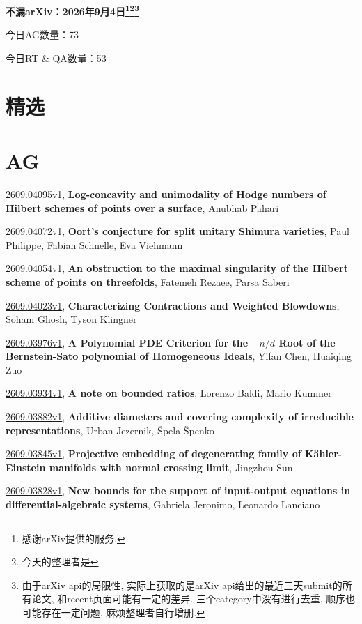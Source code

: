 \documentclass[9pt, a4paper]{article}
\theoremstyle{plain}
\theoremstyle{definition}
\theoremstyle{remark}
\newcommand{\arxiv}[3]{\href{https://arxiv.org/abs/#1}{#1}, \textbf{\textcolor{arxivblue}{#2}}, #3}
\newcommand{\AGnumber}{73}
\newcommand{\RTQAnumber}{53}
\newcommand{\NewestDate}{2026年9月4日}
\newcommand{\todayarXiver}{} %
\begin{document}
\begin{center}
    \Huge\textbf{不漏arXiv：\NewestDate\footnote{感谢arXiv提供的服务.}\footnote{今天的整理者是\todayarXiver}\footnote{由于arXiv api的局限性, 实际上获取的是arXiv api给出的最近三天submit的所有论文, 和recent页面可能有一定的差异. 三个category中没有进行去重, 顺序也可能存在一定问题, 麻烦整理者自行增删.}} \\
\end{center}

\setcounter{section}{-1}

\begin{center}
    今日AG数量：\AGnumber
    
    今日RT \& QA数量：\RTQAnumber
    
\end{center}


\section{精选}


\section{AG}
\arxiv{2609.04095v1}{Log-concavity and unimodality of Hodge numbers of Hilbert schemes of points over a surface}{Anubhab Pahari}

\arxiv{2609.04072v1}{Oort's conjecture for split unitary Shimura varieties}{Paul Philippe, Fabian Schnelle, Eva Viehmann}

\arxiv{2609.04054v1}{An obstruction to the maximal singularity of the Hilbert scheme of points on threefolds}{Fatemeh Rezaee, Parsa Saberi}

\arxiv{2609.04023v1}{Characterizing Contractions and Weighted Blowdowns}{Soham Ghosh, Tyson Klingner}

\arxiv{2609.03976v1}{A Polynomial PDE Criterion for the $-n/d$ Root of the Bernstein-Sato polynomial of Homogeneous Ideals}{Yifan Chen, Huaiqing Zuo}

\arxiv{2609.03934v1}{A note on bounded ratios}{Lorenzo Baldi, Mario Kummer}

\arxiv{2609.03882v1}{Additive diameters and covering complexity of irreducible representations}{Urban Jezernik, Špela Špenko}

\arxiv{2609.03845v1}{Projective embedding of degenerating family of Kähler-Einstein manifolds with normal crossing limit}{Jingzhou Sun}

\arxiv{2609.03828v1}{New bounds for the support of input-output equations in differential-algebraic systems}{Gabriela Jeronimo, Leonardo Lanciano}
\end{document}

